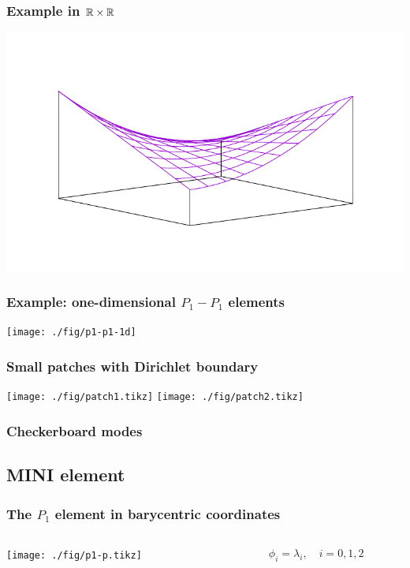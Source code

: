 \documentclass[american,ignorenonframetext,notheorems]{beamer}
\begin{document}
\begin{frame}
  \frametitle{Example in $\mathbb R\times \mathbb R$}
  \centering
  \includegraphics[width=.8\textwidth]{mixed/graph/saddle}
\end{frame}
\begin{frame}
  \frametitle{Example: one-dimensional $P_1-P_1$ elements}
  \begin{center}
      \texttt{[image: ./fig/p1-p1-1d]}
  \end{center}
\end{frame}

\begin{frame}
  \frametitle{Small patches with Dirichlet boundary}
  \begin{center}
    \hfill
    \texttt{[image: ./fig/patch1.tikz]}
    \hfill
    \texttt{[image: ./fig/patch2.tikz]}
    \hfill\mbox{}
  \end{center}
\end{frame}

\begin{frame}
  \frametitle{Checkerboard modes}
  
\end{frame}

\subsection{MINI element}

\begin{frame}
  \frametitle{The $P_1$ element in barycentric coordinates}
  \begin{columns}
    \begin{column}{.5\textwidth}
      \begin{center}
        \texttt{[image: ./fig/p1-p.tikz]}
      \end{center}
    \end{column}
    \begin{column}{.5\textwidth}
      \begin{gather}
        \phi_i = \lambda_i,
        \quad i=0,1,2
      \end{gather}
    \end{column}
  \end{columns}
\end{frame}
\end{document}
